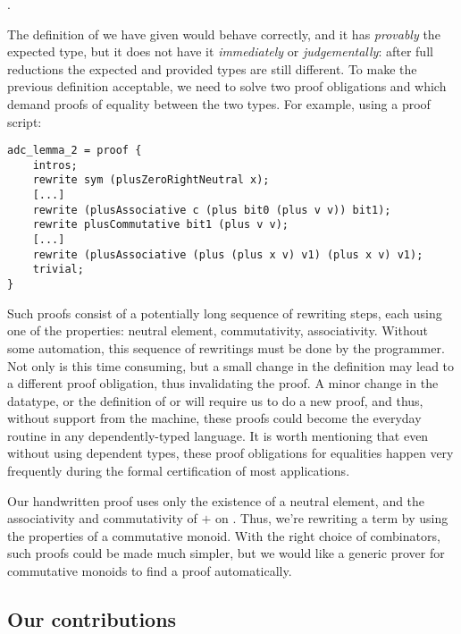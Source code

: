 .

The definition of  we have given would behave correctly, and it has
\emph{provably} the expected type, but it does not have it \emph{immediately}
or \emph{judgementally}: after full reductions the expected and provided types are still
different.
To make the previous
definition acceptable, we need to solve two proof obligations
 and  which demand proofs of equality
between the two types.
For example, using a proof script: 

\begin{lstlisting}
adc_lemma_2 = proof {
    intros;
    rewrite sym (plusZeroRightNeutral x);
    [...]
    rewrite (plusAssociative c (plus bit0 (plus v v)) bit1);
    rewrite plusCommutative bit1 (plus v v);
    [...]
    rewrite (plusAssociative (plus (plus x v) v1) (plus x v) v1);
    trivial;
}
\end{lstlisting}

Such proofs consist of a potentially long sequence of
rewriting steps, each using one of the properties: neutral element,
commutativity, associativity. Without some automation, this sequence of
rewritings must be done by the programmer.  Not only is this time consuming,
but a small change in the definition may lead to a different proof obligation,
thus invalidating the proof. 
A minor change in the datatype, or 
the definition of  or  will require us
to do a new proof, and thus, without support from the machine, these
proofs
could become the everyday routine in any dependently-typed language. It is worth mentioning that even without using dependent types, these proof obligations for equalities happen very frequently during the formal certification of most applications.

Our handwritten proof  uses only the existence of a neutral
element, and the associativity and commutativity of $+$ on . Thus,
we're rewriting a term by using the properties of a commutative monoid. 
With the right choice of combinators, such proofs could be made much simpler,
but we would like a generic prover for commutative monoids to find a proof
automatically.

\subsection{Our contributions}

